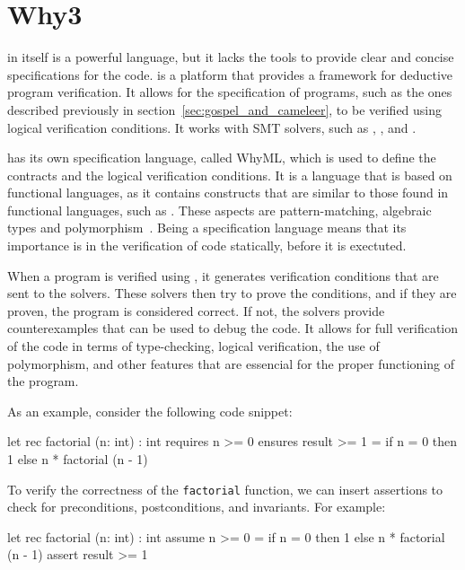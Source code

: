 \section{Why3}
\label{sec:why3}

\ocaml in itself is a powerful language, but it lacks the tools to provide clear 
and concise specifications for the code. \why is a platform that provides a framework 
for deductive program verification. It allows for the specification of programs, such as the ones 
described previously in section~\ref{sec:gospel_and_cameleer}, to be verified using 
logical verification conditions. It works with SMT solvers, such as \zthree, \altergo, 
and \coq.

\why has its own specification language, called WhyML, which is used to define the 
contracts and the logical verification conditions. It is a language that is based on 
functional languages, as it contains constructs that are similar to those found in 
functional languages, such as \ocaml. These aspects are pattern-matching, algebraic types 
and polymorphism~\cite{Pereira}. Being a specification language means that its importance is 
in the verification of code statically, before it is exectuted.

When a program is verified using \why, it generates verification conditions that are 
sent to the solvers. These solvers then try to prove the conditions, and if they are 
proven, the program is considered correct. If not, the solvers provide counterexamples 
that can be used to debug the code. It allows for full verification of the code in terms 
of type-checking, logical verification, the use of polymorphism, and other features that 
are essencial for the proper functioning of the program.

As an example, consider the following code snippet: 

\begin{whylang}
    let rec factorial (n: int) : int
        requires { n >= 0 }
        ensures { result >= 1 }
    = if n = 0 then 1 else n * factorial (n - 1)
\end{whylang}

To verify the correctness of the \texttt{factorial} function, we can insert assertions 
to check for preconditions, postconditions, and invariants. For example: 

\begin{whylang}
    let rec factorial (n: int) : int
        assume { n >= 0 }
        = if n = 0 then 1
        else n * factorial (n - 1)
        assert { result >= 1 }
\end{whylang}

